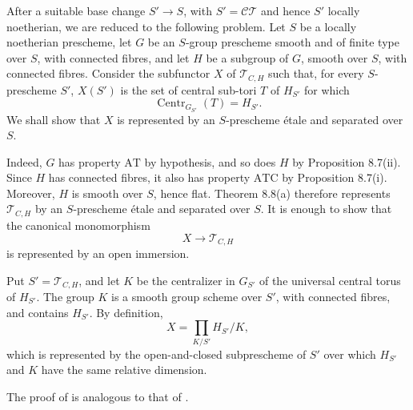 After a suitable base change \(S'\to S\), with
\(S'=\mathcal{CT}\) and hence \(S'\) locally noetherian, we are
reduced to the following problem. Let \(S\) be a locally noetherian
prescheme, let \(G\) be an \(S\)-group prescheme smooth and of
finite type over \(S\), with connected fibres, and let \(H\) be a
subgroup of \(G\), smooth over \(S\), with connected fibres.
Consider the subfunctor \(X\) of \(\mathcal T_{C,H}\) such that,
for every \(S\)-prescheme \(S'\), \(X(S')\) is the set of central
sub-tori \(T\) of \(H_{S'}\) for which
\[
  \operatorname{Centr}_{G_{S'}}(T)=H_{S'}.
\]
We shall show that \(X\) is represented by an \(S\)-prescheme
étale and separated over \(S\).

Indeed, \(G\) has property \(\mathrm{AT}\) by hypothesis, and so
does \(H\) by Proposition 8.7(ii). Since \(H\) has connected
fibres, it also has property \(\mathrm{ATC}\) by
Proposition 8.7(i). Moreover, \(H\) is smooth over \(S\), hence
flat. Theorem 8.8(a) therefore represents \(\mathcal T_{C,H}\) by
an \(S\)-prescheme étale and separated over \(S\). It is enough to
show that the canonical monomorphism
\[
  X\longrightarrow\mathcal T_{C,H}
\]
is represented by an open immersion.

Put \(S'=\mathcal T_{C,H}\), and let \(K\) be the centralizer in
\(G_{S'}\) of the universal central torus of \(H_{S'}\). The group
\(K\) is a smooth group scheme over \(S'\), with connected fibres,
and contains \(H_{S'}\). By definition,
\[
  X=\prod_{K/S'} H_{S'}/K,
\]
which is represented by the open-and-closed subprescheme of \(S'\)
over which \(H_{S'}\) and \(K\) have the same relative dimension.

The proof of  is analogous to that of
.


